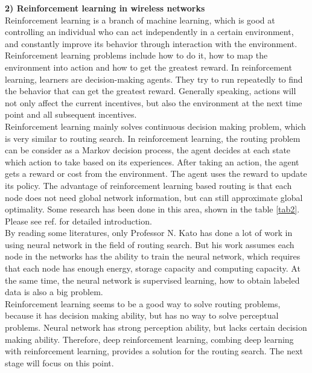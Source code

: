 \documentclass[11pt]{report}
\begin{document}
	\noindent \textbf{2) Reinforcement learning in wireless networks}\\
	Reinforcement learning is a branch of machine learning, which is good at controlling an individual who can act independently in a certain environment, and constantly improve its behavior through interaction with the environment. Reinforcement learning problems include how to do it, how to map the environment into action and how to get the greatest reward. In reinforcement learning, learners are decision-making agents. They try to run repeatedly to find the behavior that can get the greatest reward. Generally speaking, actions will not only affect the current incentives, but also the environment at the next time point and all subsequent incentives.\\
	
	\noindent Reinforcement learning mainly solves continuous decision making problem, which is very similar to routing search. In reinforcement learning, the routing problem can be consider as a Markov decision process, the agent decides at each state which action to take based on its experiences. After taking an action, the agent gets a reward or cost from the environment. The agent uses the reward to update its policy. The advantage of reinforcement learning based routing is that each node does not need global network information, but can still approximate global optimality. Some research has been done in this area, shown in the table \ref{tab2}. Please see ref. \cite{5648764} for detailed introduction.\\
	
	
	\noindent By reading some literatures, only Professor N. Kato has done a lot of work in using neural network in the field of routing search. But his work assumes each node in the networks has the ability to train the neural network, which requires that each node has enough energy, storage capacity and computing capacity. At the same time, the neural network is supervised learning, how to obtain labeled data is also a big problem.\\
	
	\noindent Reinforcement learning seems to be a good way to solve routing problems, because it has decision making ability, but has no way to solve perceptual problems. Neural network has strong perception ability, but lacks certain decision making ability. Therefore, deep reinforcement learning, combing deep learning with reinforcement learning, provides a solution for the routing search. The next stage will focus on this point.
	
\end{document}
